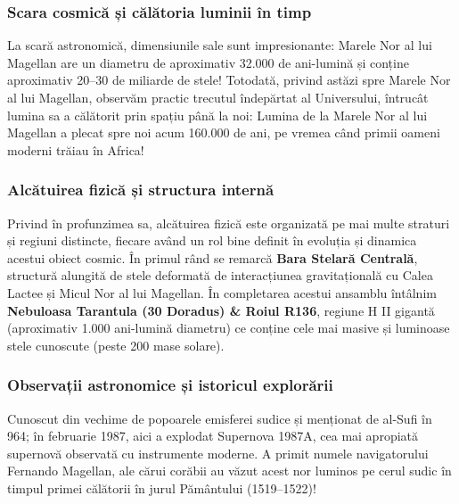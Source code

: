 \subsubsection*{Scara cosmică și călătoria luminii în timp}
La scară astronomică, dimensiunile sale sunt impresionante: Marele Nor al lui Magellan are un diametru de aproximativ 32.000 de ani-lumină și conține aproximativ 20--30 de miliarde de stele! Totodată, privind astăzi spre Marele Nor al lui Magellan, observăm practic trecutul îndepărtat al Universului, întrucât lumina sa a călătorit prin spațiu până la noi: Lumina de la Marele Nor al lui Magellan a plecat spre noi acum 160.000 de ani, pe vremea când primii oameni moderni trăiau în Africa!

\subsubsection*{Alcătuirea fizică și structura internă}
Privind în profunzimea sa, alcătuirea fizică este organizată pe mai multe straturi și regiuni distincte, fiecare având un rol bine definit în evoluția și dinamica acestui obiect cosmic. În primul rând se remarcă \textbf{Bara Stelară Centrală}, structură alungită de stele deformată de interacțiunea gravitațională cu Calea Lactee și Micul Nor al lui Magellan. În completarea acestui ansamblu întâlnim \textbf{Nebuloasa Tarantula (30 Doradus) \& Roiul R136}, regiune H II gigantă (aproximativ 1.000 ani-lumină diametru) ce conține cele mai masive și luminoase stele cunoscute (peste 200 mase solare).

\subsubsection*{Observații astronomice și istoricul explorării}
Cunoscut din vechime de popoarele emisferei sudice și menționat de al-Sufi în 964; în februarie 1987, aici a explodat Supernova 1987A, cea mai apropiată supernovă observată cu instrumente moderne. A primit numele navigatorului Fernando Magellan, ale cărui corăbii au văzut acest nor luminos pe cerul sudic în timpul primei călătorii în jurul Pământului (1519--1522)!

